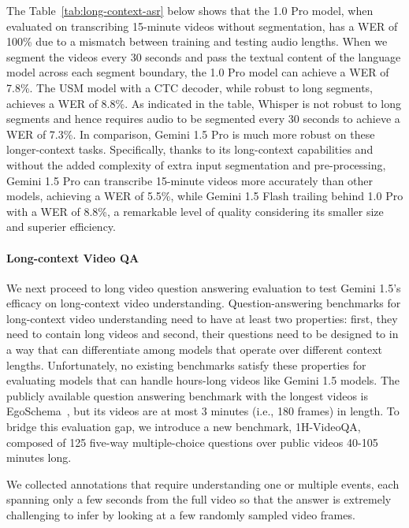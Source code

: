The Table~\ref{tab:long-context-asr} below shows that the 1.0 Pro model, when evaluated on transcribing 15-minute videos without segmentation, has a WER of 100\% due to a mismatch between training and testing audio lengths. When we segment the videos every 30 seconds and pass the textual content of the language model across each segment boundary, the 1.0 Pro model can achieve a WER of 7.8\%. The USM model with a CTC decoder, while robust to long segments, achieves a WER of 8.8\%. As indicated in the table, Whisper is not robust to long segments and hence requires audio to be segmented every 30 seconds to achieve a WER of 7.3\%. In comparison, Gemini 1.5 Pro is much more robust on these longer-context tasks. Specifically, thanks to its long-context capabilities and without the added complexity of extra input segmentation and pre-processing, Gemini 1.5 Pro can transcribe 15-minute videos more accurately than other models, achieving a WER of 5.5\%, while Gemini 1.5 Flash trailing behind 1.0 Pro with a WER of 8.8\%, a remarkable level of quality considering its smaller size and superier efficiency.

\paragraph{Long-context Video QA}

We next proceed to long video question answering evaluation to test Gemini 1.5's efficacy on long-context video understanding. Question-answering benchmarks for long-context video understanding need to have at least two properties: first, they need to contain long videos and second, their questions need to be designed to in a way that can differentiate among models that operate over different context lengths. Unfortunately, no existing benchmarks satisfy these properties for evaluating  models that can handle hours-long videos like Gemini 1.5 models. The publicly available question answering benchmark with the longest videos is EgoSchema~\cite{mangalam2023egoschema}, but its videos are at most 3 minutes (i.e., 180 frames) in length. To bridge this evaluation gap, we introduce a new benchmark, 1H-VideoQA, composed of 125 five-way multiple-choice questions over public videos 40-105 minutes long.

We collected annotations that require understanding one or multiple events, each spanning only a few seconds from the full video so that the answer is extremely challenging to infer by looking at a few randomly sampled video frames.

